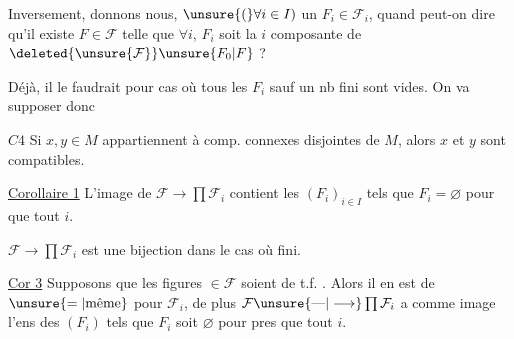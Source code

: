Inversement, donnons nous,  $\unsure{(}\forall i\in I)$ un $F_i\in\mathcal F_i$, quand peut-on dire qu'il existe $F\in\mathcal F$ telle que $\forall i$, $F_i$ soit la $i$ composante de $\deleted{\unsure{\mathcal F}}\unsure{F_0|F}$ ?

Déjà, il le faudrait pour  cas où tous les $F_i$ sauf un nb fini sont \deleted{$\varnothing$} vides. On va supposer donc

\uline{$C4$} Si $x,y\in M$ appartiennent à  comp. connexes disjointes de $M$, alors $x$ et $y$ sont compatibles.

 

\uline{Corollaire 1} L'image de $\mathcal F\to\prod\mathcal F_i$ contient les $(F_i)_{i\in I}$ tels que $F_i=\varnothing$  pour que tout $i$.

  $\mathcal F\to\prod\mathcal F_i$ est une bijection dans  le  cas où    fini.



\uline{Cor 3} Supposons que les figures  $\in\mathcal F$ soient de t.f.  . Alors il en est de $\unsure{=|\text{même}}$  pour $\mathcal F_i$, de plus $\mathcal F\unsure{\text{---}|\longrightarrow}\prod\mathcal F_i$ a comme image l'ens des $(F_i)$ tels que $F_i$ soit $\varnothing$ pour pres que tout $i$.
